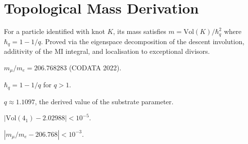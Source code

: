 \chapter{Topological Mass Derivation}

\begin{theorem}
  \label{thm:topological-mass}
  \leanok
  For a particle identified with knot $K$, its mass satisfies
  $m = \mathrm{Vol}(K) / \hbar_q^2$ where $\hbar_q = 1 - 1/q$.
  Proved via the eigenspace decomposition of the descent involution,
  additivity of the MI integral, and localisation to exceptional divisors.
\end{theorem}

\begin{definition}
  \label{def:mu-e-ratio}
  \leanok
  $m_\mu / m_e = 206.768283$ (CODATA 2022).
\end{definition}

\begin{definition}
  \label{def:quantum-planck}
  \leanok
  $\hbar_q = 1 - 1/q$ for $q > 1$.
\end{definition}

\begin{definition}
  \label{def:substrate-q}
  \leanok
  $q \approx 1.1097$, the derived value of the substrate parameter.
\end{definition}

\begin{lemma}
  \label{lem:vol-approx}
  $|\mathrm{Vol}(4_1) - 2.02988| < 10^{-5}$.
\end{lemma}

\begin{lemma}
  \label{lem:mu-e-approx}
  $|m_\mu/m_e - 206.768| < 10^{-3}$.
\end{lemma}

